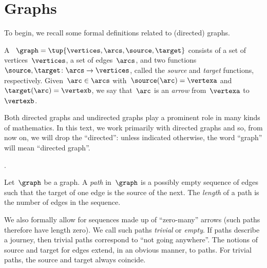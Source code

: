 
\section{Graphs}

To begin, we recall some formal definitions related to (directed) graphs.

\begin{definition}[Graph]
    \label{def:Graph}
    A \emph{}~$\graph=\tup{\vertices,\arcs, \source,\target}$ consists of a set of vertices~$\vertices$, a set of edges~$\arcs$, and two functions~$\source,\target \colon \arcs \to \vertices$, called the \emph{source} and \emph{target} functions, respectively.
    Given~$\arc\in \arcs$ with~$\source(\arc)=\vertexa$ and~$\target(\arc)=\vertexb$, we say that~$\arc$ is an \emph{arrow} from~$\vertexa$ to~$\vertexb$.
\end{definition}

\begin{remark}
    Both directed graphs and undirected graphs play a prominent role in many kinds of mathematics.
    In this text, we work primarily with directed graphs and so, from now on, we will drop the ``directed'': unless indicated otherwise, the word ``graph'' will mean ``directed graph''.
\end{remark}
.
\begin{definition}[Paths]
    \label{def:path}
    Let~$\graph$ be a graph.
    A \emph{path} in~$\graph$ is a possibly empty sequence of edges such that the target of one edge is the source of the next.
    The \emph{length} of a path is the number of edges in the sequence.
\end{definition}
We also formally allow for sequences made up of ``zero-many'' arrows (such paths therefore have length zero).
We call such paths \emph{trivial} or \emph{empty}.
If paths describe a journey, then trivial paths correspond to ``not going anywhere''.
The notions of source and target for edges extend, in an obvious manner, to paths.
For trivial paths, the source and target always coincide.